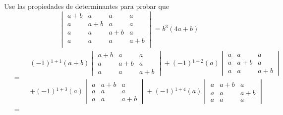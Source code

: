 \item Use las propiedades de determinantes para probar que \\
    \[
        \begin{vmatrix}
            a + b & a & a & a \\ 
            a & a + b & a & a \\ 
            a & a & a + b & a \\ 
            a & a & a & a + b \\ 
        \end{vmatrix}
        =
        b^3(4a + b)
    \]
    \[
        \begin{aligned}
            &=
            \begin{aligned}
                &
                (-1){}^{1 + 1}
                (a + b)
                \begin{vmatrix}
                    a + b & a & a \\
                    a & a + b & a \\
                    a & a & a + b
                \end{vmatrix}
                +
                (-1){}^{1 + 2}
                (a)
                \begin{vmatrix}
                    a & a & a \\
                    a & a + b & a \\
                    a & a & a + b
                \end{vmatrix}
                \\
                &+
                (-1){}^{1 + 3}
                (a)
                \begin{vmatrix}
                    a & a + b & a \\
                    a & a & a \\
                    a & a & a + b
                \end{vmatrix}
                +
                (-1){}^{1 + 4}
                (a)
                \begin{vmatrix}
                    a & a + b & a \\
                    a & a & a + b \\
                    a & a & a
                \end{vmatrix}
            \end{aligned}
            \\[0.25cm]
            &=
            \begin{aligned}

\end{aligned}
\end{aligned}\]

